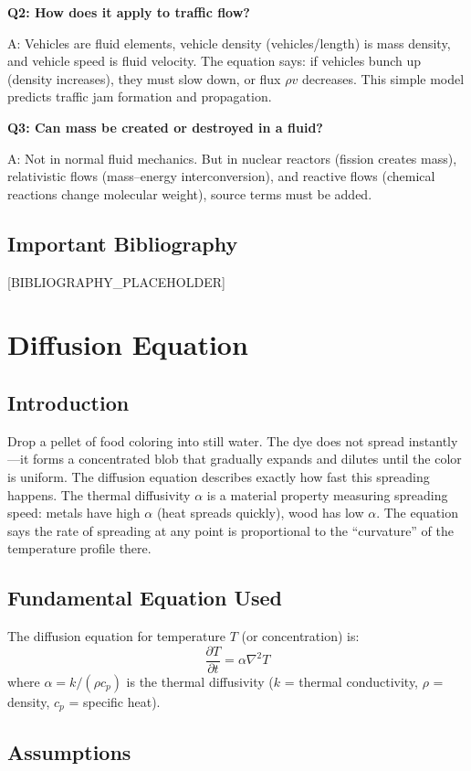 \documentclass[11pt,openright]{book}
\begin{document}
\textbf{Q2: How does it apply to traffic flow?}

A: Vehicles are fluid elements, vehicle density (vehicles/length) is mass density, and vehicle speed is fluid velocity. The equation says: if vehicles bunch up (density increases), they must slow down, or flux $\rho v$ decreases. This simple model predicts traffic jam formation and propagation.

\textbf{Q3: Can mass be created or destroyed in a fluid?}

A: Not in normal fluid mechanics. But in nuclear reactors (fission creates mass), relativistic flows (mass--energy interconversion), and reactive flows (chemical reactions change molecular weight), source terms must be added.
\section*{Important Bibliography}

[BIBLIOGRAPHY_PLACEHOLDER]


\chapter{Diffusion Equation}

\section*{Introduction}

Drop a pellet of food coloring into still water. The dye does not spread instantly---it forms a concentrated blob that gradually expands and dilutes until the color is uniform. The diffusion equation describes exactly how fast this spreading happens. The thermal diffusivity $\alpha$ is a material property measuring spreading speed: metals have high $\alpha$ (heat spreads quickly), wood has low $\alpha$. The equation says the rate of spreading at any point is proportional to the ``curvature'' of the temperature profile there.
\section*{Fundamental Equation Used}

The diffusion equation for temperature $T$ (or concentration) is:
\[
\frac{\partial T}{\partial t} = \alpha \nabla^2 T
\]
where $\alpha = k/(\rho c_p)$ is the thermal diffusivity ($k$ = thermal conductivity, $\rho$ = density, $c_p$ = specific heat).
\section*{Assumptions}
\end{document}

